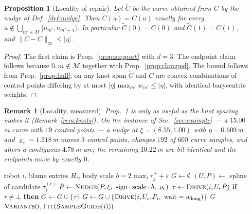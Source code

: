 \documentclass[conference]{IEEEtran}
\newtheorem{proposition}{Proposition}
\newtheorem{remark}{Remark}
\newcommand{\clr}{\varepsilon}
\begin{document}
\begin{proposition}[Locality of repair]
\label{prop:locality}
Let $\tilde C$ be the curve obtained from $C$ by the nudge of Def.~\ref{def:nudge}. Then
$\tilde C(u) = C(u)$ exactly for every
$u \notin \bigcup_{m' \in \mathcal{M}}[u_{m'},u_{m'+4})$. In particular $\tilde C(0)=C(0)$
and $\tilde C(1)=C(1)$, and $\lVert \tilde C - C\rVert_\infty \le |\eta|$.
\end{proposition}

\begin{proof}
The first claim is Prop.~\ref{prop:support} with $d=3$. The endpoint claim follows because
$0,m \notin \mathcal{M}$ together with Prop.~\ref{prop:clamped}. The bound follows from
Prop.~\ref{prop:hull}: on any knot span $\tilde C$ and $C$ are convex combinations of
control points differing by at most $|\eta| \max_{m'} w_{m'} \le |\eta|$, with identical
barycentric weights.
\end{proof}

\begin{remark}[Locality, measured]
\label{rem:locality-measured}
Prop.~\ref{prop:locality} is only as useful as the knot spacing makes it
(Remark~\ref{rem:knots}). On the instance of Sec.~\ref{sec:example} --- a $15.00$\,m curve
with $19$ control points --- a nudge at $\xi = (8.55, 1.00)$ with
$\eta = 0.609$\,m and $\varrho_r = 1.218$\,m moves $3$ control points, changes $192$ of
$600$ curve samples, and alters a contiguous $4.78$\,m arc; the remaining $10.22$\,m are
bit-identical and the endpoints move by exactly $0$.
\end{remark}

\begin{algorithm}[t]
\caption{\textsc{Repair}: new candidates for a blamed robot}
\label{alg:repair}
\begin{algorithmic}[1]
\Require robot $i$, blame entries $H_i$, body scale $b = 2\max_j r^{+}_j + \clr$
\State $G \gets \emptyset$
  \State $(U,P) \gets$ spline of candidate $\tau_i^{(c)}$
    \State $\tilde P \gets \textsc{Nudge}(P, \xi,\ \text{sign}\cdot\text{scale}\cdot b,\
           \varrho_r)$
    \State $\tau \gets \textsc{Drive}(i, U, \tilde P)$
    \State \textbf{if} $\tau \neq \bot$ \textbf{then} $G \gets G \cup \{\tau\}$
  \EndFor
\EndFor
{}
  \State $G \gets G \cup \{\textsc{Drive}(i, U_i, P_i,\ \text{wait}=w_{\text{long}})\}$
  \State \Return $G$ \Comment{geometric repair succeeded}
\EndIf
\State \Return $\textsc{Variants}(i, \textsc{Fit}(\textsc{SampleGuide}(i)))$
\end{algorithmic}
\end{algorithm}
\end{document}
